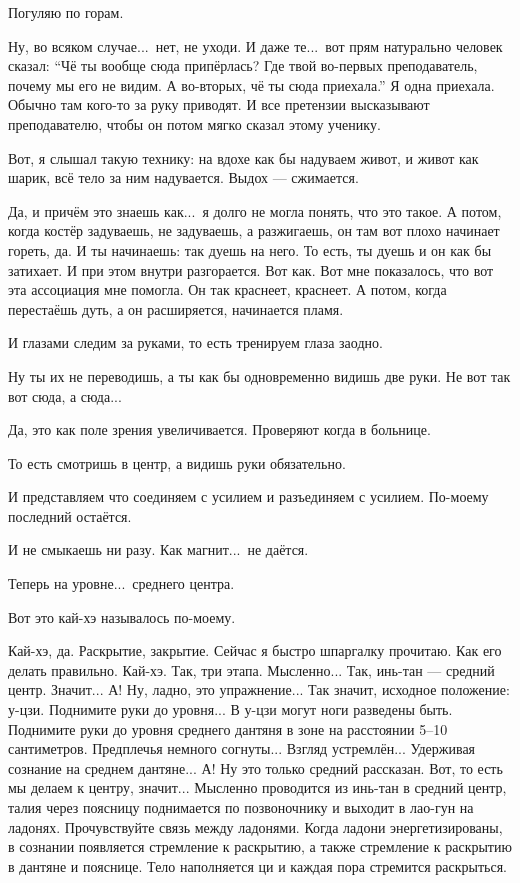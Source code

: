 \I
Погуляю по горам.

\M
Ну, во всяком случае...\ нет, не уходи. И даже те...\ вот прям натурально человек
сказал: ``Чё ты вообще сюда припёрлась? Где твой во-первых преподаватель,
почему мы его не видим. А во-вторых, чё ты сюда приехала.''
Я одна приехала.
Обычно там кого-то за руку приводят. И все претензии высказывают преподавателю,
чтобы он потом мягко сказал этому ученику.

\I
Вот, я слышал такую технику: на вдохе как бы надуваем живот, и живот как шарик,
всё тело за ним надувается. Выдох --- сжимается.

\M
Да, и причём это знаешь как...\ я долго не могла понять, что это такое. А
потом, когда костёр задуваешь, не задуваешь, а разжигаешь, он там вот плохо начинает гореть, да.
И ты начинаешь: так дуешь на него.
То есть, ты дуешь и он как бы затихает.
И при этом внутри разгорается. Вот как. Вот мне показалось, что вот эта ассоциация мне помогла.
Он так краснеет, краснеет.
А потом, когда перестаёшь дуть, а он расширяется, начинается пламя.

\I
И глазами следим за руками, то есть тренируем глаза заодно.

\M
Ну ты их не переводишь, а ты как бы одновременно видишь две руки. Не вот так вот сюда,
а сюда...

\I
Да, это как поле зрения увеличивается.
Проверяют когда в больнице.

\M
То есть
смотришь в центр, а видишь руки обязательно.

\I
И представляем что соединяем с усилием и разъединяем с усилием.
По-моему последний остаётся.

\M
И не смыкаешь ни разу. Как магнит...\ не даётся.

\I
Теперь на уровне...\ среднего центра.

\M
Вот это кай-хэ называлось по-моему.

\I
Кай-хэ, да.
Раскрытие, закрытие. Сейчас я быстро шпаргалку прочитаю. Как
его делать правильно. Кай-хэ. Так, три этапа.
Мысленно... Так, инь-тан --- средний центр. Значит...
А! Ну, ладно, это упражнение... Так значит, исходное положение: у-цзи.
Поднимите руки до уровня... В у-цзи могут ноги разведены быть. Поднимите
руки до уровня среднего дантяня в зоне на расстоянии 5--10
сантиметров. Предплечья немного согнуты... Взгляд устремлён...
Удерживая сознание на среднем дантяне... А! Ну это только средний рассказан. Вот,
то есть мы делаем к центру, значит... Мысленно проводится из инь-тан в средний центр,
талия через поясницу поднимается по позвоночнику и выходит в лао-гун на ладонях.
Прочувствуйте связь между ладонями. Когда ладони энергетизированы, в сознании появляется
стремление к раскрытию, а также стремление к раскрытию в дантяне и пояснице.
Тело наполняется ци и каждая пора стремится раскрыться.


